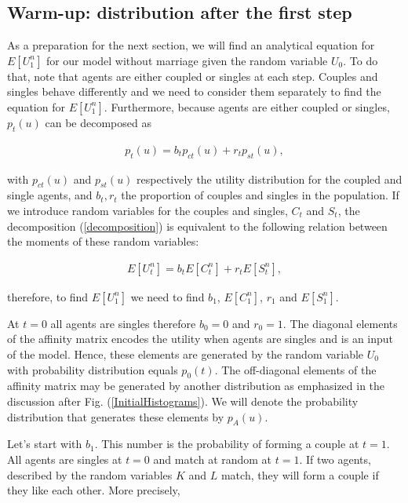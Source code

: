 \documentclass[12pt]{article}
\begin{document}
\subsection{Warm-up: distribution after the first step}
\label{firststep}

As a preparation for the next section, we will find an analytical equation for $E[U_1^n]$ for our model without marriage given the random variable $U_0$. To do that, note that agents are either coupled or singles at each step. Couples and singles behave differently and we need to consider them separately to find the equation for $E[U_1^n]$. Furthermore, because agents are either coupled or singles, $p_t(u)$ can be decomposed as

\begin{align}
    p_t(u)=b_tp_{ct}(u)+r_tp_{st}(u),
    \label{decomposition}
\end{align}

\noindent with $p_{ct}(u)$ and $p_{st}(u)$ respectively the utility distribution for the coupled and single agents, and $b_t,r_t$ the proportion of couples and singles in the population. If we introduce random variables for the couples and singles, $C_t$ and $S_t$, the decomposition (\ref{decomposition}) is equivalent to the following relation between the moments of these random variables:

\begin{align}
    E[U_t^n]=b_{t}E[C_t^n]+r_tE[S_t^n],
    \label{UtCtSt}
\end{align}

\noindent therefore, to find $E[U_1^n]$ we need to find $b_1$, $E[C_1^n]$, $r_1$ and $E[S_1^n]$.

At $t=0$ all agents are singles therefore $b_0=0$ and $r_0=1$. The diagonal elements of the affinity matrix encodes the utility when agents are singles and is an input of the model. Hence, these elements are generated by the random variable $U_0$ with probability distribution equals $p_0(t)$. The off-diagonal elements of the affinity matrix may be generated by another distribution as emphasized in the discussion after Fig. (\ref{InitialHistograms}). We will denote the probability distribution that generates these elements by $p_A(u)$.

Let's start with $b_1$. This number is the probability of forming a couple at $t=1$. All agents are singles at $t=0$ and match at random at $t=1$. If two agents, described by the random variables $K$ and $L$ match, they will form a couple if they like each other. More precisely,
\end{document}
